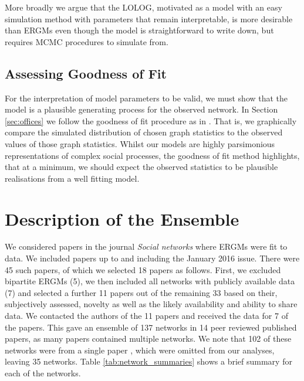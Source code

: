\documentclass[
]{statsoc}
\begin{document}
More broadly we argue that the LOLOG, motivated as a model with an easy
simulation method with parameters that remain interpretable, is more
desirable than ERGMs even though the model is straightforward to write
down, but requires MCMC procedures to simulate from.

\subsection{Assessing Goodness of Fit}

For the interpretation of model parameters to be valid, we must show
that the model is a plausible generating process for the observed
network. In Section \ref{sec:offices} we follow the goodness of fit
procedure as in \cite{Hunter_Goodreau_2008}. That is, we graphically
compare the simulated distribution of chosen graph statistics to the
observed values of those graph statistics. Whilst our models are highly
parsimonious representations of complex social processes, the goodness
of fit method highlights, that at a minimum, we should expect the
observed statistics to be plausible realisations from a well fitting
model.

\section{Description of the Ensemble}\label{sec:description}

We considered papers in the journal \emph{Social networks} where ERGMs
were fit to data. We included papers up to and including the January
2016 issue. There were 45 such papers, of which we selected 18 papers as
follows. First, we excluded bipartite ERGMs (5), we then included all
networks with publicly available data (7) and selected a further 11
papers out of the remaining 33 based on their, subjectively assessed,
novelty as well as the likely availability and ability to share data. We
contacted the authors of the 11 papers and received the data for 7 of
the papers. This gave an ensemble of 137 networks in 14 peer reviewed
published papers, as many papers contained multiple networks. We note
that 102 of these networks were from a single paper \citep{Lubbers2007},
which were omitted from our analyses, leaving 35 networks. Table
\ref{tab:network_summaries} shows a brief summary for each of the
networks.
\end{document}
